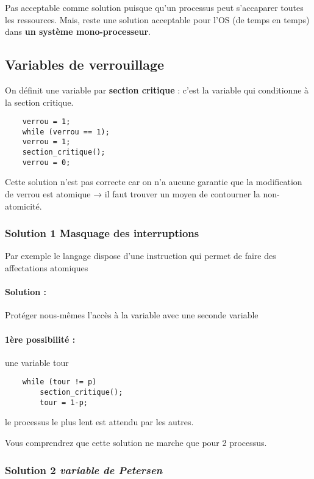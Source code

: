 \documentclass[11pt, a4paper]{article}
\begin{document}
Pas acceptable comme solution puisque qu'un processus peut s'accaparer toutes les ressources. Mais, reste une solution acceptable pour l'OS (de temps en temps) dans \textbf{un système mono-processeur}.

\subsection{Variables de verrouillage}

On définit une variable par \textbf{section critique} : c'est la variable qui conditionne à la section critique.

    \begin{verbatim}
    verrou = 1;
    while (verrou == 1);
    verrou = 1;
    section_critique();
    verrou = 0;
    \end{verbatim}

Cette solution n'est pas correcte car on n'a aucune garantie que la modification de verrou est atomique → il faut trouver un moyen de contourner la non-atomicité.

\subsubsection{Solution 1 Masquage des interruptions}

Par exemple le langage dispose d'une instruction qui permet de faire des affectations atomiques

\paragraph{Solution :} Protéger nous-mêmes l'accès à la variable avec une seconde variable 

\paragraph{1ère possibilité :} une variable tour

    \begin{verbatim}
    while (tour != p)
        section_critique();
        tour = 1-p;
    \end{verbatim}

le processus le plus lent est attendu par les autres.

Vous comprendrez que cette solution ne marche que pour 2 processus.

\subsubsection[Solution 2. variable de Petersen]{Solution 2 {\normalfont\emph{variable de Petersen}}}
\end{document}

